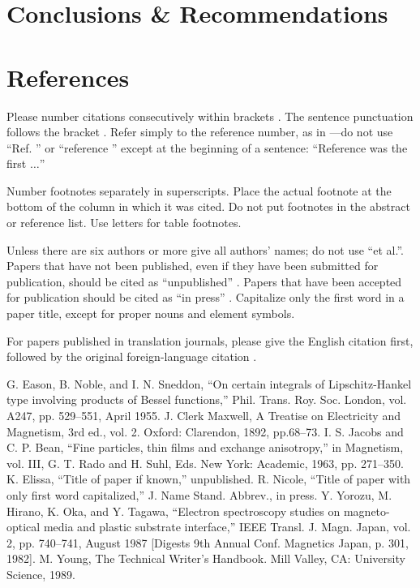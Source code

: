 \documentclass[conference]{IEEEtran}
\begin{document}
\section{Conclusions \& Recommendations}
\blindtext

\section*{References}

Please number citations consecutively within brackets \cite{b1}. The 
sentence punctuation follows the bracket \cite{b2}. Refer simply to the reference 
number, as in \cite{b3}---do not use ``Ref. \cite{b3}'' or ``reference \cite{b3}'' except at 
the beginning of a sentence: ``Reference \cite{b3} was the first $\ldots$''

Number footnotes separately in superscripts. Place the actual footnote at 
the bottom of the column in which it was cited. Do not put footnotes in the 
abstract or reference list. Use letters for table footnotes.

Unless there are six authors or more give all authors' names; do not use 
``et al.''. Papers that have not been published, even if they have been 
submitted for publication, should be cited as ``unpublished'' \cite{b4}. Papers 
that have been accepted for publication should be cited as ``in press'' \cite{b5}. 
Capitalize only the first word in a paper title, except for proper nouns and 
element symbols.

For papers published in translation journals, please give the English 
citation first, followed by the original foreign-language citation \cite{b6}.

\begin{thebibliography}{00}
 G. Eason, B. Noble, and I. N. Sneddon, ``On certain integrals of Lipschitz-Hankel type involving products of Bessel functions,'' Phil. Trans. Roy. Soc. London, vol. A247, pp. 529--551, April 1955.
 J. Clerk Maxwell, A Treatise on Electricity and Magnetism, 3rd ed., vol. 2. Oxford: Clarendon, 1892, pp.68--73.
 I. S. Jacobs and C. P. Bean, ``Fine particles, thin films and exchange anisotropy,'' in Magnetism, vol. III, G. T. Rado and H. Suhl, Eds. New York: Academic, 1963, pp. 271--350.
 K. Elissa, ``Title of paper if known,'' unpublished.
 R. Nicole, ``Title of paper with only first word capitalized,'' J. Name Stand. Abbrev., in press.
 Y. Yorozu, M. Hirano, K. Oka, and Y. Tagawa, ``Electron spectroscopy studies on magneto-optical media and plastic substrate interface,'' IEEE Transl. J. Magn. Japan, vol. 2, pp. 740--741, August 1987 [Digests 9th Annual Conf. Magnetics Japan, p. 301, 1982].
 M. Young, The Technical Writer's Handbook. Mill Valley, CA: University Science, 1989.
\end{thebibliography}
\end{document}
